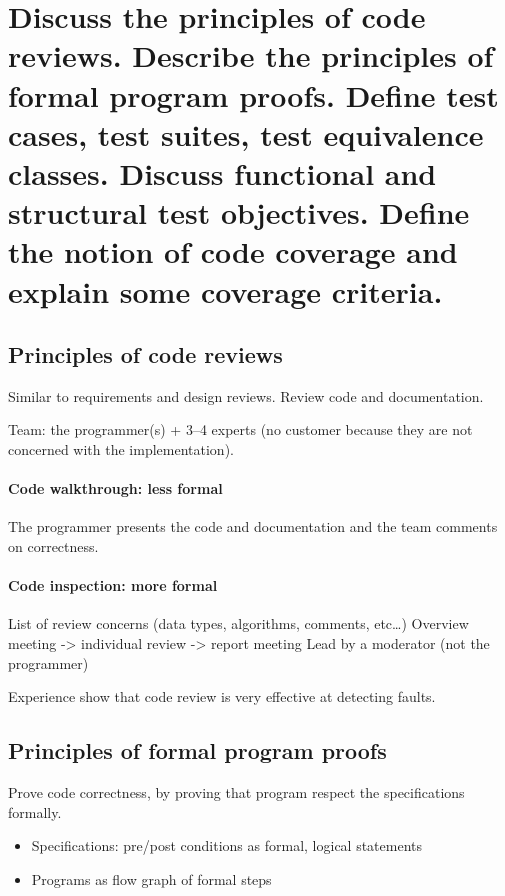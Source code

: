 \clearpage{}
\section{Discuss the principles of code reviews. Describe the principles of
formal program proofs. Define test cases, test suites, test equivalence
classes. Discuss functional and structural test objectives. Define the
notion of code coverage and explain some coverage criteria.}


\subsection{Principles of code reviews}

Similar to requirements and design reviews. \newline
Review code and documentation. \newline

Team: the programmer(s) + 3--4 experts (no customer because they are not concerned with the implementation).

\paragraph{Code walkthrough: less formal}
The programmer presents the code and documentation and the team comments on
correctness.

\paragraph{Code inspection: more formal}

List of review concerns (data types, algorithms, comments, etc\ldots)
Overview meeting -> individual review -> report meeting
Lead by a moderator (not the programmer) \newline

Experience show that code review is very effective at detecting faults.

\subsection{Principles of formal program proofs}

Prove code correctness, by proving that program respect the specifications formally.
\begin{itemize}
	\item Specifications: pre/post conditions as formal, logical statements
	\item Programs as flow graph of formal steps
\end{itemize}
